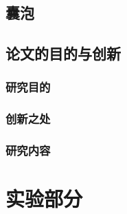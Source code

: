 \documentclass[bachelor,fandolfonts,replaceperiod]{jnuthesis}
\begin{document}
    
    \section{囊泡}
    
    
    \section{论文的目的与创新}
    \subsection{研究目的}
    \subsection{创新之处}
    \subsection{研究内容}
    
    \chapter{实验部分}\label{chapter:experiment}
\end{document}
